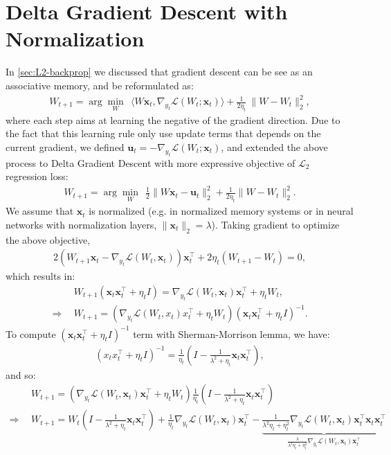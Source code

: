 \documentclass{article}
\newcommand{\undermath}[2]{\underset{#1}{\underbrace{#2}}}
\newcommand{\inner}[2]{\langle #1, #2 \rangle}
\newcommand{\vx}{\boldsymbol{x}}
\begin{document}
{\section{Delta Gradient Descent with Normalization}\label{app:DGD}
In \autoref{sec:L2-backprop} we discussed that gradient descent can be see as an associative memory, and be reformulated as:
\begin{align}
    W_{t+1} = \arg\min_{W} \:\: \inner{W\boldsymbol{x}_t}{\nabla_{y_t} \mathcal{L}(W_t;\boldsymbol{x}_t)} + \frac{1}{2\eta_t} \: \|W - W_{t}\|^{2}_2,
\end{align}
where each step aims at learning the negative of the gradient direction. Due to the fact that this learning rule only use update terms that depends on the current gradient, we defined $\mathbf{u}_t = -\nabla_{y_t} \mathcal{L}(W_t;\boldsymbol{x}_t)$, and extended the above process to Delta Gradient Descent with more expressive objective of $\mathcal{L}_2$ regression loss:
\begin{align}
    W_{t+1} = \arg\min_{W} \:\: \frac{1}{2}\|W\boldsymbol{x}_t - \mathbf{u}_t \|^{2}_2 +  \frac{1}{2\eta_t}\|W - W_{t}\|^{2}_2.
\end{align}
We assume that $\vx_t$ is normalized (e.g.  in normalized memory systems or in neural networks with normalization layers, $\|\vx_t\|_2 = \lambda$). Taking gradient to optimize the above objective, 
\begin{align}
    2(W_{t+1}\vx_t - \nabla_{y_t} \mathcal{L}(W_t,\vx_t))\vx_t^{\top} + 2 \eta_t (W_{t+1}-W_t) = 0,
\end{align}
which results in:
\begin{align}
    &W_{t+1}(\vx_t \vx_t^{\top} + \eta_t I) = \nabla_{y_t} \mathcal{L}(W_t,\vx_t) \vx_t^{\top} + \eta_t W_t, \\
    \Rightarrow\:\:&W_{t+1} = (\nabla_{y_t} \mathcal{L}(W_t,x_t) x_t^{\top} + \eta_t W_t)(\vx_t \vx_t^{\top} + \eta_t I)^{-1}.
\end{align}
To compute $( \vx_t \vx_t^{\top} + \eta_t I)^{-1}$ term with  Sherman-Morrison lemma, we have:
\begin{align}
    (x_tx_t^{\top} + \eta_t I)^{-1} = \frac{1}{\eta_t} (I - \frac{1}{\lambda^2+\eta_t} \vx_t \vx_t^{\top}),
\end{align}
and so:
\begin{align}
    &W_{t+1} = (\nabla_{y_t} \mathcal{L}(W_t,\vx_t) \vx_t^{\top} + \eta_t W_t)\frac{1}{\eta_t} (I - \frac{1}{\lambda^2+\eta_t}  \vx_t \vx_t^{\top}) \\
    \Rightarrow \:\:& W_{t+1} = W_t \left(I - \frac{1}{\lambda^2+\eta_t}  \vx_t \vx_t^{\top} \right) +  \frac{1}{\eta_t} \nabla_{y_t} \mathcal{L}(W_t,\vx_t) \vx_t^{\top} - \undermath{\frac{\lambda}{\lambda^2\eta_t+\eta^2_t} \nabla_{y_t} \mathcal{L}(W_t,\vx_t) \vx_t^{\top}}{\frac{1}{\lambda^2\eta_t+\eta^2_t} \nabla_{y_t} \mathcal{L}(W_t,\vx_t) \vx_t^{\top}\vx_t \vx_t^{\top}} \\

\end{align}}
\end{document}
